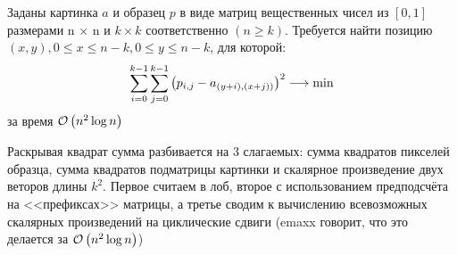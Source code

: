 \begin{task}[6]
 Заданы картинка $a$ и образец $p$ в виде матриц вещественных чисел из $[0, 1]$ размерами n × n и
 $k \times k$ соответственно $(n \geq k)$. Требуется найти позицию $(x, y), 0 \leq x \leq n - k, 0 \leq y \leq n - k$, для
 которой:
 \[
 	\sum_{i=0}^{k-1} { \sum_{j = 0}^{k - 1} {\left( p_{i,j} - a_{(y+i), (x+j))} \right)^2} }
 	\longrightarrow \min
 \]
 за время $\mathcal{O}\left(n^2 \log n\right)$
\end{task}
\begin{solution}
Раскрывая квадрат сумма разбивается на 3 слагаемых: сумма квадратов пикселей образца, сумма квадратов подматрицы картинки и скалярное произведение двух веторов длины $k^2$. Первое считаем в лоб, второе с использованием предподсчёта на <<префиксах>> матрицы, а третье сводим к вычислению всевозможных скалярных произведений на циклические сдвиги (emaxx говорит, что это делается за $\mathcal{O}\left(n^2 \log n\right)$)
\xqed
\end{solution}


